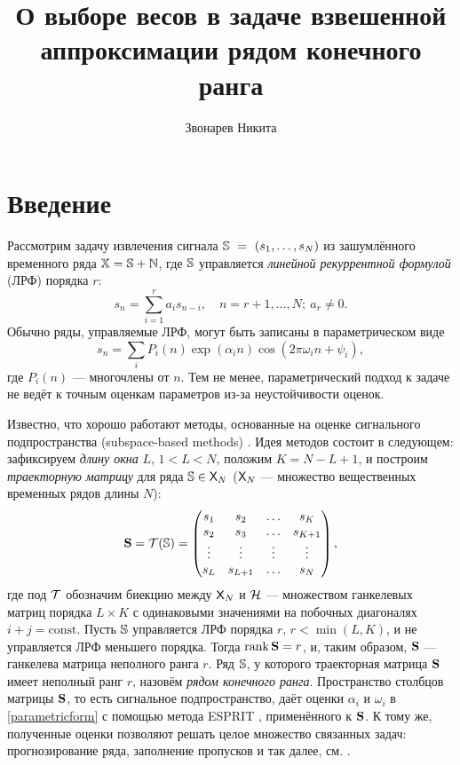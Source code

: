 \documentclass[10pt]{article}
\author{Звонарев Никита}
\title{О выборе весов в задаче взвешенной аппроксимации рядом конечного ранга}
\def\rank{\mathop{\mathrm{rank}}}
\begin{document}
\maketitle

\section*{Введение}
Рассмотрим задачу извлечения сигнала $\mathbb{S}~=~(s_1, \ldots, s_N)$ из зашумлённого временного ряда $\mathbb{X} = \mathbb{S} + \mathbb{N}$, где $\mathbb{S}$ управляется \emph{линейной рекуррентной формулой} (ЛРФ) порядка $r$:
\begin{equation*}
s_n = \sum_{i = 1}^{r} a_i s_{n-i}, \quad n = r + 1, \ldots, N;\  a_r\neq 0.
\end{equation*}
Обычно ряды, управляемые ЛРФ, могут быть записаны в параметрическом виде
\begin{equation} \label{parametricform}
s_n = \sum_i P_i(n) \exp(\alpha_i n) \cos(2 \pi \omega_i n + \psi_i),
\end{equation}
где $P_i(n)$ --- многочлены от $n$. Тем не менее, параметрический подход к задаче не ведёт к точным оценкам параметров из-за неустойчивости оценок.

Известно, что хорошо работают методы, основанные на оценке сигнального подпространства (subspace-based methods) \cite{Broomhead.King1986, Vautard.etal1992, Elsner.Tsonis1996, Golyandina.etal2001}. Идея методов состоит в следующем: зафиксируем \emph{длину окна} $L$, $1 < L < N$, положим $K = N - L + 1$, и построим \emph{траекторную матрицу} для ряда $\mathbb{S} \in \mathsf{X}_N$ ($\mathsf{X}_N$ --- множество вещественных временных рядов длины $N$):
\begin{equation*}
\mathbf{S} = \mathcal{T}(\mathbb{S}) =  \begin{pmatrix}
s_1 & s_2 & \ldots & s_K \\
s_2 & s_3 & \ldots & s_{K + 1} \\
\vdots & \vdots & \vdots & \vdots \\
s_L & s_{L + 1} & \ldots & s_N
\end{pmatrix},
\end{equation*}
где под $\mathcal{T}$ обозначим биекцию между $\mathsf{X}_N$ и $\mathcal{H}$ --- множеством ганкелевых матриц порядка $L \times K$ с одинаковыми значениями на побочных диагоналях $i+j=\mathrm{const}$.
Пусть $\mathbb{S}$ управляется ЛРФ порядка $r$, $r < \min(L, K)$, и не управляется ЛРФ меньшего порядка. Тогда $\rank \bfS = r$, и, таким образом, $\mathbf{S}$ --- ганкелева матрица неполного ранга $r$. Ряд $\mathbb{S}$, у которого траекторная матрица $\mathbf{S}$ имеет неполный ранг $r$, назовём \emph{рядом конечного ранга}. Пространство столбцов матрицы $\mathbf{S}$, то есть сигнальное подпространство, даёт оценки $\alpha_i$ и $\omega_i$ в \eqref{parametricform} с помощью метода ESPRIT \cite{Roy.Kailath1989, Golyandina.Zhigljavsky2012}, применённого к $\mathbf{S}$. К тому же, полученные оценки позволяют решать целое множество связанных задач: прогнозирование ряда, заполнение пропусков и так далее, см. \cite{Golyandina.etal2001}.
\end{document}
